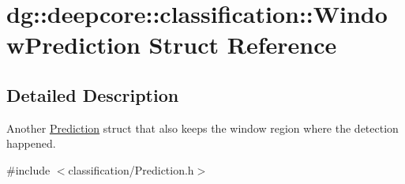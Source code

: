 \hypertarget{structdg_1_1deepcore_1_1classification_1_1_window_prediction}{}\section{dg\+:\+:deepcore\+:\+:classification\+:\+:Window\+Prediction Struct Reference}
\label{structdg_1_1deepcore_1_1classification_1_1_window_prediction}


\subsection{Detailed Description}
Another \hyperlink{structdg_1_1deepcore_1_1classification_1_1_prediction}{Prediction} struct that also keeps the window region where the detection happened. 

{\ttfamily \#include $<$classification/\+Prediction.\+h$>$}

